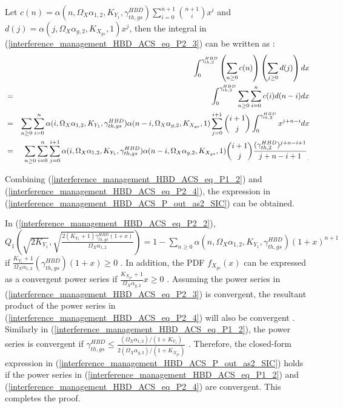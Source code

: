 Let $c(n) = \alpha(n,\Omega_X\alpha_{1,2},K_{Y_1},\gamma_{th,gs}^{HBD})\sum_{i=0}^{n+1}\binom{n+1}{i}x^{i}$ and $ d(j) = \alpha(j,\Omega_X\alpha_{g,2},K_{X_{gs}},1)x^j$, then the integral in (\ref{interference_management_HBD_ACS_eq_P2_3}) can be written as \cite{andras2011generalized, bartoszewicz2012algebrability}:
\begin{eqnarray} \label{interference_management_HBD_ACS_eq_P2_4}
 & & \hspace{-1cm} \int_{0}^{\gamma_{th,2}^{HBD}}\left(\sum_{n\geq0}c(n)\right)\left(\sum_{j\geq0}d(j)\right) dx \nonumber \\
 & = & \int_{0}^{\gamma_{th,2}^{HBD}} \sum_{n\geq0}\sum_{i=0}^{n}c(i)d(n-i) dx \nonumber\\
 & = & \sum_{n\geq0}\sum_{i=0}^{n}\alpha(i,\Omega_X\alpha_{1,2},K_{Y_1},\gamma_{th,gs}^{HBD}) \alpha(n-i,\Omega_X\alpha_{g,2},K_{X_{gs}},1) \sum_{j=0}^{i+1}\binom{i+1}{j}\int_{0}^{\gamma_{th,2}^{HBD}}x^{j+n-i}dx \nonumber\\
 & = & \sum_{n\geq0}\sum_{i=0}^{n}\sum_{j=0}^{i+1} \alpha(i,\Omega_X\alpha_{1,2},K_{Y_1},\gamma_{th,gs}^{HBD}) \alpha(n-i,\Omega_X\alpha_{g,2},K_{X_{gs}},1)\binom{i+1}{j}\frac{(\gamma_{th,2}^{HBD})^{j+n-i+1}}{j+n-i+1}_.
\end{eqnarray}

Combining (\ref{interference_management_HBD_ACS_eq_P1_2}) and (\ref{interference_management_HBD_ACS_eq_P2_4}), the expression in (\ref{interference_management_HBD_ACS_P_out_as2_SIC}) can be obtained.

In (\ref{interference_management_HBD_ACS_eq_P2_2}), $Q_1\left( \sqrt{2K_{Y_1}}, \sqrt{\frac{2(K_{Y_1}+1)\gamma_{th,gs}^{HBD}(1+x)}{\Omega_{X}\alpha_{1,2}}} \right) = 1 - \sum_{n\geq0}{\alpha(n,\Omega_X\alpha_{1,2},K_{Y_1},\gamma_{th,gs}^{HBD})(1+x)^{n+1}}$ if $\frac{K_{Y_1}+1}{\Omega_{X}\alpha_{1,2}}(\gamma_{th,gs}^{HBD})(1+x)\geq0$ \cite{andras2011generalized}. In addition, the PDF $f_{X_{gs}}(x)$ can be expressed as a convergent power series if $\frac{K_{X_{gs}}+1}{\Omega_{X}\alpha_{g,2}}x\geq0$ \cite{andras2011generalized}. Assuming the power series in (\ref{interference_management_HBD_ACS_eq_P2_3}) is convergent, the resultant product of the power series in (\ref{interference_management_HBD_ACS_eq_P2_4}) will also be convergent \cite{bartoszewicz2012algebrability}. Similarly in (\ref{interference_management_HBD_ACS_eq_P1_2}), the power series is convergent if $\gamma_{th,gs}^{HBD}\leq \frac{(\Omega_{X}\alpha_{1,2})/(1+K_{Y_1})}{2(\Omega_{X}\alpha_{g,2})/(1+K_{X_{gs}})}$ \cite{rached2017unified}. Therefore, the closed-form expression in (\ref{interference_management_HBD_ACS_P_out_as2_SIC}) holds if the power series in (\ref{interference_management_HBD_ACS_eq_P1_2}) and (\ref{interference_management_HBD_ACS_eq_P2_4}) are convergent. This completes the proof.

